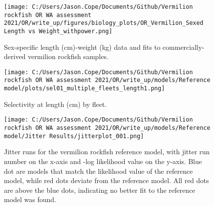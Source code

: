 \documentclass[11pt,
  english,
  a4paper,
]{article}
\begin{document}
\tagmcend\tagstructend


\begin{figure}
\centering
\texttt{[image: C:/Users/Jason.Cope/Documents/Github/Vermilion rockfish OR WA assessment 2021/OR/write\_up/figures/biology\_plots/OR\_Vermilion\_Sexed Length vs Weight\_withpower.png]}
\caption{Sex-specific length (cm)-weight (kg) data and fits to commercially-derived vermilion rockfish samples.\label{fig:len-weight-fit}}
\end{figure}

\tagmcend\tagstructend


\begin{figure}
\centering
\texttt{[image: C:/Users/Jason.Cope/Documents/Github/Vermilion rockfish OR WA assessment 2021/OR/write\_up/models/Reference model/plots/sel01\_multiple\_fleets\_length1.png]}
\caption{Selectivity at length (cm) by fleet.\label{fig:selex}}
\end{figure}

\tagmcend\tagstructend


\begin{figure}
\centering
\texttt{[image: C:/Users/Jason.Cope/Documents/Github/Vermilion rockfish OR WA assessment 2021/OR/write\_up/models/Reference model/Jitter Results/jitterplot\_001.png]}
\caption{Jitter runs for the vermilion rockfish reference model, with jitter run number on the x-axis and -log likelihood value on the y-axis. Blue dot are models that match the likelihood value of the reference model, while red dots deviate from the reference model. All red dots are above the blue dots, indicating no better fit to the reference model was found.\label{fig:jitter_001}}
\end{figure}
\end{document}
